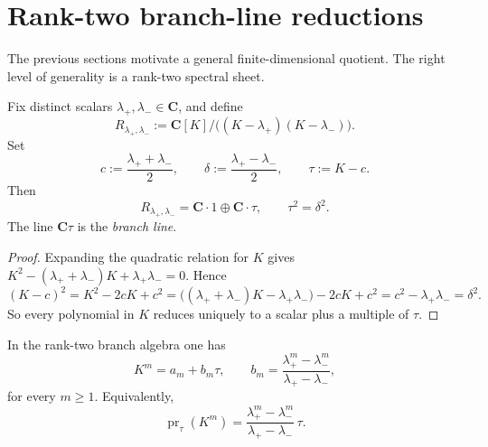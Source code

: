 \section{Rank-two branch-line reductions}
\label{sec:blr-rank-two-branch}

The previous sections motivate a general finite-dimensional quotient.
The right level of generality is a rank-two spectral sheet.

\begin{construction}
\label{const:rank-two-branch-algebra}
Fix distinct scalars \(\lambda_+,\lambda_-\in \mathbf C\), and define
\begin{equation}
\label{eq:rank-two-branch-algebra}
 R_{\lambda_+,\lambda_-}
 :=
 \mathbf C[K]\big/\bigl((K-\lambda_+)(K-\lambda_-)\bigr).
\end{equation}
Set
\[
 c:=\frac{\lambda_++\lambda_-}{2},
 \qquad
 \delta:=\frac{\lambda_+-\lambda_-}{2},
 \qquad
 \tau:=K-c.
\]
Then
\begin{equation}
\label{eq:tau-square-general}
 R_{\lambda_+,\lambda_-}=\mathbf C\cdot 1\oplus \mathbf C\cdot\tau,
 \qquad
 \tau^2=\delta^2.
\end{equation}
The line \(\mathbf C\tau\) is the \emph{branch line}.
\end{construction}

\begin{proof}
Expanding the quadratic relation for \(K\) gives
\(K^2-(\lambda_++\lambda_-)K+\lambda_+\lambda_-=0\). Hence
\[
(K-c)^2
=
K^2-2cK+c^2
=
\bigl((\lambda_++\lambda_-)K-\lambda_+\lambda_-\bigr)-2cK+c^2
=
c^2-\lambda_+\lambda_-
=
\delta^2.
\]
So every polynomial in \(K\) reduces uniquely to a scalar plus a
multiple of \(\tau\).
\end{proof}

\begin{lemma}
\label{lem:universal-branch-moments}
In the rank-two branch algebra one has
\begin{equation}
\label{eq:universal-branch-moments}
K^m=a_m+b_m\tau,
\qquad
b_m=
\frac{\lambda_+^m-\lambda_-^m}{\lambda_+-\lambda_-},
\end{equation}
for every \(m\geq 1\). Equivalently,
\begin{equation}
\label{eq:branch-line-projection}
\operatorname{pr}_{\tau}(K^m)
=
\frac{\lambda_+^m-\lambda_-^m}{\lambda_+-\lambda_-}\,\tau.
\end{equation}
\end{lemma}

